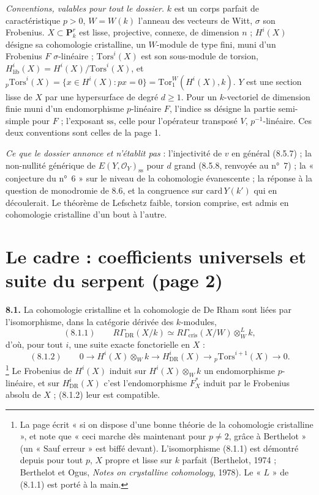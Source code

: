 \documentclass[11pt,a4paper]{article}
\begin{document}
\emph{Conventions, valables pour tout le dossier.} $k$ est un corps parfait de
caractéristique $p > 0$, $W = W(k)$ l'anneau des vecteurs de Witt, $\sigma$
son Frobenius. $X \subset \mathbf{P}^{r}_{k}$ est lisse, projective, connexe,
de dimension $n$ ; $H^{i}(X)$ désigne sa cohomologie cristalline, un
$W$-module de type fini, muni d'un Frobenius $F$ $\sigma$-linéaire ;
$\mathrm{Tors}^{i}(X)$ est son sous-module de torsion,
$H^{i}_{\mathrm{lib}}(X) = H^{i}(X)/\mathrm{Tors}^{i}(X)$, et
${}_{p}\mathrm{Tors}^{i}(X) = \{x \in H^{i}(X) : px = 0\}
= \mathrm{Tor}^{W}_{1}(H^{i}(X), k)$. $Y$ est une section lisse de $X$ par une
hypersurface de degré $d \geq 1$. Pour un $k$-vectoriel de dimension finie
muni d'un endomorphisme $p$-linéaire $F$, l'indice $\mathrm{ss}$ désigne la
partie semi-simple pour $F$ ; l'exposant $\mathrm{ss}$, celle pour
l'opérateur transposé $V$, $p^{-1}$-linéaire. Ces deux conventions sont
celles de la page 1.

\emph{Ce que le dossier annonce et n'établit pas} : l'injectivité de $v$ en
général (8.5.7) ; la non-nullité générique de
$E(Y, \mathcal{O}_{Y})_{\mathrm{ss}}$ pour $d$ grand (8.5.8, renvoyée au
n°~7) ; la « conjecture du n°~6 » sur le niveau de la cohomologie
évanescente ; la réponse à la question de monodromie de 8.6, et la
congruence sur $\mathrm{card}\, Y(k')$ qui en découlerait. Le théorème de
Lefschetz faible, torsion comprise, est admis en cohomologie cristalline
d'un bout à l'autre.

\section*{Le cadre : coefficients universels et suite du serpent (page 2)}

\textbf{8.1.} La cohomologie cristalline et la cohomologie de De Rham sont
liées par l'isomorphisme, dans la catégorie dérivée des $k$-modules,
\[
(8.1.1) \qquad R\Gamma_{\mathrm{DR}}(X/k) \simeq R\Gamma_{\mathrm{cris}}(X/W)
\otimes^{L}_{W} k ,
\]
d'où, pour tout $i$, une suite exacte fonctorielle en $X$ :
\[
(8.1.2) \qquad 0 \to H^{i}(X) \otimes_{W} k \to H^{i}_{\mathrm{DR}}(X)
\to {}_{p}\mathrm{Tors}^{i+1}(X) \to 0 .
\]
\footnote{La page écrit « si on dispose d'une bonne théorie de la cohomologie
cristalline », et note que « ceci marche dès maintenant pour $p \neq 2$, grâce
à Berthelot » (un « Sauf erreur » est biffé devant). L'isomorphisme (8.1.1)
est démontré depuis pour tout $p$, $X$ propre et lisse sur $k$ parfait
(Berthelot, 1974 ; Berthelot et Ogus, \emph{Notes on crystalline cohomology},
1978). Le « $L$ » de (8.1.1) est porté à la main.}
Le Frobenius de $H^{i}(X)$ induit sur $H^{i}(X) \otimes_{W} k$ un endomorphisme
$p$-linéaire, et sur $H^{i}_{\mathrm{DR}}(X)$ c'est l'endomorphisme $F_{X}^{*}$
induit par le Frobenius absolu de $X$ ; (8.1.2) leur est compatible.
\end{document}
